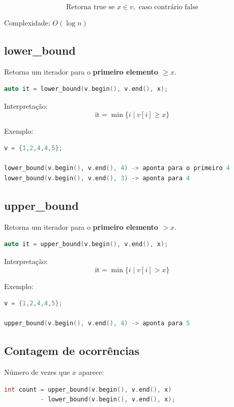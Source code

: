 \documentclass[11pt]{article}
\begin{document}
\[
\text{Retorna true se } x \in v, \text{ caso contrário false}
\]

Complexidade: \(O(\log n)\)

\bigskip

\subsection{lower\_bound}

Retorna um iterador para o \textbf{primeiro elemento $\geq x$}.

\begin{lstlisting}[language=C++]
auto it = lower_bound(v.begin(), v.end(), x);
\end{lstlisting}

Interpretação:
\[
\text{it} = \min \{ i \mid v[i] \geq x \}
\]

Exemplo:
\begin{lstlisting}[language=C++]
v = {1,2,4,4,5};

lower_bound(v.begin(), v.end(), 4) -> aponta para o primeiro 4
lower_bound(v.begin(), v.end(), 3) -> aponta para 4
\end{lstlisting}

\bigskip

\subsection{upper\_bound}

Retorna um iterador para o \textbf{primeiro elemento $> x$}.

\begin{lstlisting}[language=C++]
auto it = upper_bound(v.begin(), v.end(), x);
\end{lstlisting}

Interpretação:
\[
\text{it} = \min \{ i \mid v[i] > x \}
\]

Exemplo:
\begin{lstlisting}[language=C++]
v = {1,2,4,4,5};

upper_bound(v.begin(), v.end(), 4) -> aponta para 5
\end{lstlisting}

\bigskip

\subsection{Contagem de ocorrências}

Número de vezes que \(x\) aparece:

\begin{lstlisting}[language=C++]
int count = upper_bound(v.begin(), v.end(), x)
          - lower_bound(v.begin(), v.end(), x);
\end{lstlisting}
\end{document}
